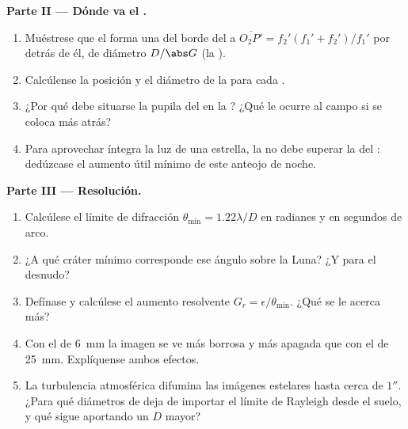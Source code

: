 \begin{problem}
\medskip
\noindent\textbf{Parte II --- Dónde va el .}
\begin{enumerate}[resume]
  \item Muéstrese que el  forma una  del borde del
         a $\overline{O_2P'} = f_2'(f_1' + f_2')/f_1'$ por detrás
        de él, de diámetro $D/\abs G$ (la ).
  \item Calcúlense la posición y el diámetro de la  para
        cada .
  \item ¿Por qué debe situarse la pupila del  en la ?
        ¿Qué le ocurre al campo si se coloca más atrás?
  \item Para aprovechar íntegra la luz de una estrella, la  no debe superar la del : dedúzcase el aumento útil
        mínimo de este anteojo de noche.
\end{enumerate}

\medskip
\noindent\textbf{Parte III --- Resolución.}
\begin{enumerate}[resume]
  \item Calcúlese el límite de difracción $\theta_{\min} = 1.22\lambda/D$
        en radianes y en segundos de arco.
  \item ¿A qué cráter mínimo corresponde ese ángulo sobre la Luna? ¿Y para
        el  desnudo?
  \item Defínase y calcúlese el aumento resolvente $G_r =
        \epsilon/\theta_{\min}$. ¿Qué  se le acerca más?
  \item Con el  de \qty{6}{mm} la imagen se ve más borrosa y más
        apagada que con el de \qty{25}{mm}. Explíquense ambos efectos.
  \item La turbulencia atmosférica difumina las imágenes estelares hasta
        cerca de $1''$. ¿Para qué diámetros de  deja de importar
        el límite de Rayleigh desde el suelo, y qué sigue aportando un $D$
        mayor?
\end{enumerate}


\end{problem}
